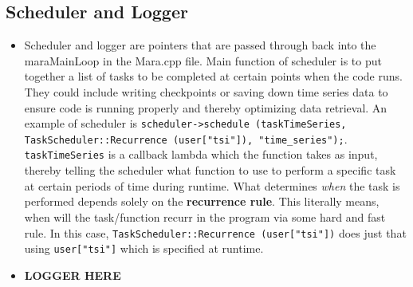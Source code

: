 \documentclass{article}
\begin{document}
\subsection{Scheduler and Logger}
\begin{itemize}
	\item Scheduler and logger are pointers that are passed through back into the maraMainLoop in the Mara.cpp file. Main function of scheduler is to put together a list of tasks to be completed at certain points when the code runs. They could include writing checkpoints or saving down time series data to ensure code is running properly and thereby optimizing data retrieval. An example of scheduler is \texttt{scheduler->schedule (taskTimeSeries, TaskScheduler::Recurrence (user["tsi"]), "time\_series");}. \texttt{taskTimeSeries} is a callback lambda which the function takes as input, thereby telling the scheduler what function to use to perform a specific task at certain periods of time during runtime. What determines \emph{when} the task is performed depends solely on the \textbf{recurrence rule}. This literally means, when will the task/function recurr in the program via some hard and fast rule. In this case, \texttt{TaskScheduler::Recurrence (user["tsi"])} does just that using \texttt{user["tsi"]} which is specified at runtime. 
	\item \textbf{LOGGER HERE}
\end{itemize}
\end{document}

